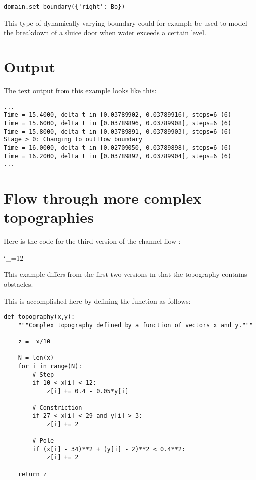\documentclass{manual}
\newcommand{\verbatiminputB}[1]{%
\endgroup}
\def\verbatiminputunderscore{\begingroup
\catcode`\_=12
\verbatiminputB}
\begin{document}
\begin{verbatim}
domain.set_boundary({'right': Bo})
\end{verbatim}

This type of dynamically varying boundary could for example be
used to model the breakdown of a sluice door when water exceeds a certain level.

\section{Output}

The text output from this example looks like this:

\begin{verbatim}
...
Time = 15.4000, delta t in [0.03789902, 0.03789916], steps=6 (6)
Time = 15.6000, delta t in [0.03789896, 0.03789908], steps=6 (6)
Time = 15.8000, delta t in [0.03789891, 0.03789903], steps=6 (6)
Stage > 0: Changing to outflow boundary
Time = 16.0000, delta t in [0.02709050, 0.03789898], steps=6 (6)
Time = 16.2000, delta t in [0.03789892, 0.03789904], steps=6 (6)
...
\end{verbatim}

\section{Flow through more complex topographies}

Here is the code for the third version of the channel flow :

\verbatiminputunderscore{../../anuga_core/examples/channel3.py}

This example differs from the first two versions in that the topography
contains obstacles.

This is accomplished here by defining the function  as follows:

\begin{verbatim}
def topography(x,y):
    """Complex topography defined by a function of vectors x and y."""

    z = -x/10

    N = len(x)
    for i in range(N):
        # Step
        if 10 < x[i] < 12:
            z[i] += 0.4 - 0.05*y[i]

        # Constriction
        if 27 < x[i] < 29 and y[i] > 3:
            z[i] += 2

        # Pole
        if (x[i] - 34)**2 + (y[i] - 2)**2 < 0.4**2:
            z[i] += 2

    return z
\end{verbatim}
\end{document}
